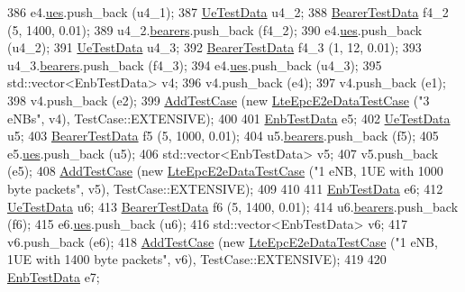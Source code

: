 \begin{DoxyCode}
386   e4.\hyperlink{structEnbTestData_a0b5de379df31368a33410980a16d2dd7}{ues}.push\_back (u4\_1);
387   \hyperlink{structUeTestData}{UeTestData} u4\_2;
388   \hyperlink{structBearerTestData}{BearerTestData} f4\_2 (5, 1400, 0.01);
389   u4\_2.\hyperlink{structUeTestData_ab02618dc9dfd673f397c313dae3df481}{bearers}.push\_back (f4\_2);
390   e4.\hyperlink{structEnbTestData_a0b5de379df31368a33410980a16d2dd7}{ues}.push\_back (u4\_2);
391   \hyperlink{structUeTestData}{UeTestData} u4\_3;
392   \hyperlink{structBearerTestData}{BearerTestData} f4\_3 (1, 12, 0.01);
393   u4\_3.\hyperlink{structUeTestData_ab02618dc9dfd673f397c313dae3df481}{bearers}.push\_back (f4\_3);
394   e4.\hyperlink{structEnbTestData_a0b5de379df31368a33410980a16d2dd7}{ues}.push\_back (u4\_3);
395   std::vector<EnbTestData> v4;  
396   v4.push\_back (e4);
397   v4.push\_back (e1);
398   v4.push\_back (e2);
399   \hyperlink{classns3_1_1TestCase_a3718088e3eefd5d6454569d2e0ddd835}{AddTestCase} (\textcolor{keyword}{new} \hyperlink{classLteEpcE2eDataTestCase}{LteEpcE2eDataTestCase} (\textcolor{stringliteral}{"3 eNBs"}, v4), 
      TestCase::EXTENSIVE);
400 
401   \hyperlink{structEnbTestData}{EnbTestData} e5;
402   \hyperlink{structUeTestData}{UeTestData} u5;
403   \hyperlink{structBearerTestData}{BearerTestData} f5 (5, 1000, 0.01);
404   u5.\hyperlink{structUeTestData_ab02618dc9dfd673f397c313dae3df481}{bearers}.push\_back (f5);
405   e5.\hyperlink{structEnbTestData_a0b5de379df31368a33410980a16d2dd7}{ues}.push\_back (u5);
406   std::vector<EnbTestData> v5;
407   v5.push\_back (e5);
408   \hyperlink{classns3_1_1TestCase_a3718088e3eefd5d6454569d2e0ddd835}{AddTestCase} (\textcolor{keyword}{new} \hyperlink{classLteEpcE2eDataTestCase}{LteEpcE2eDataTestCase} (\textcolor{stringliteral}{"1 eNB, 1UE with 1000 byte
       packets"}, v5), TestCase::EXTENSIVE);
409 
410 
411   \hyperlink{structEnbTestData}{EnbTestData} e6;
412   \hyperlink{structUeTestData}{UeTestData} u6;
413   \hyperlink{structBearerTestData}{BearerTestData} f6 (5, 1400, 0.01);
414   u6.\hyperlink{structUeTestData_ab02618dc9dfd673f397c313dae3df481}{bearers}.push\_back (f6);
415   e6.\hyperlink{structEnbTestData_a0b5de379df31368a33410980a16d2dd7}{ues}.push\_back (u6);
416   std::vector<EnbTestData> v6;
417   v6.push\_back (e6);
418   \hyperlink{classns3_1_1TestCase_a3718088e3eefd5d6454569d2e0ddd835}{AddTestCase} (\textcolor{keyword}{new} \hyperlink{classLteEpcE2eDataTestCase}{LteEpcE2eDataTestCase} (\textcolor{stringliteral}{"1 eNB, 1UE with 1400 byte
       packets"}, v6), TestCase::EXTENSIVE);
419 
420   \hyperlink{structEnbTestData}{EnbTestData} e7;

\end{DoxyCode}
